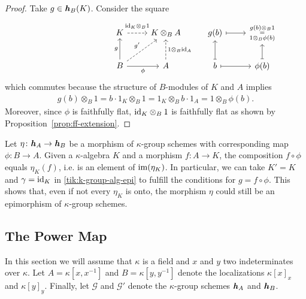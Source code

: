\begin{proof}
    Take $g\in\textrm{\boldmath$\mathit h$}_B(K)$. Consider the square
    \begin{equation}\label{eq:ff-implies-epi}
        \begin{tikzcd}
            &&&&K
                    \arrow[r,"\vphantom{\big|}\id_K\otimes_B1",dashed]
                &K\otimes_BA
                &g(b)
                    \arrow[r,mapsto]
                &\substack{g(b)\otimes_B1\\=\\1\otimes_B\phi(b)}\\
            &&&&B
                    \arrow[r,"\phi"']
                    \arrow[u,"g"]
                    \arrow[ru,"g'",dashed]
                &A
                    \arrow[u,"1\otimes_B\id_A"',dashed]
                &b
                    \arrow[u,mapsto]
                    \arrow[r,mapsto]
                &\phi(b)
                    \arrow[u,mapsto]
        \end{tikzcd}
    \end{equation}
    which commutes because the structure of $B$-modules of $K$ and $A$ implies
    \begin{align*}
        g(b)\otimes_B1 = b\cdot1_K\otimes_B1
            = 1_K\otimes_Bb\cdot1_A
            = 1\otimes_B\phi(b).
    \end{align*}
    Moreover, since $\phi$ is faithfully flat, $\text{\rm id}_K\otimes_B1$ is faithfully flat as shown by Proposition~\ref{prop:ff-extension}.
\end{proof}

\begin{rem}
    Let $\eta\colon\textrm{\boldmath$\mathit h$}_A\to\textrm{\boldmath$\mathit h$}_B$ be a morphism of $\kappa$-group schemes with corresponding map $\phi\colon B\to A$. Given a $\kappa$-algebra $K$ and a morphism $f\colon A\to K$, the composition $f\circ\phi$ equals $\eta_K(f)$, i.e. is an element of $\text{\rm im}(\eta_K)$. In particular, we can take $K'=K$ and $\gamma=\text{\rm id}_K$ in \eqref{tik:k-group-alg-epi} to fulfill the conditions for $g=f\circ\phi$. This shows that, even if not every $\eta_K$ is onto, the morphism $\eta$ could still be an epimorphism of $\kappa$-group schemes.
\end{rem}

\subsection{The Power Map}\label{ss:power-map}

In this section we will assume that $\kappa$ is a field and $x$ and $y$ two indeterminates over $\kappa$. Let $A=\kappa[x,x^{-1}]$ and $B=\kappa[y,y^{-1}]$ denote the localizations $\kappa[x]_x$ and $\kappa[y]_y$. Finally, let $\mathcal G$ and $\mathcal G'$ denote the $\kappa$-group schemes $\textrm{\boldmath$\mathit h$}_A$ and $\textrm{\boldmath$\mathit h$}_{B}$.

